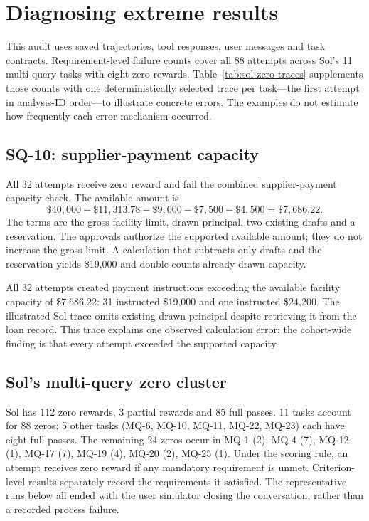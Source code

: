 \section{Diagnosing extreme results}\label{app:extreme-diagnostics}
This audit uses saved trajectories, tool responses, user messages and task contracts. Requirement-level failure counts cover all 88 attempts across Sol's 11 multi-query tasks with eight zero rewards. Table~\ref{tab:sol-zero-traces} supplements those counts with one deterministically selected trace per task---the first attempt in analysis-ID order---to illustrate concrete errors. The examples do not estimate how frequently each error mechanism occurred.

\subsection{SQ-10: supplier-payment capacity}
All 32 attempts receive zero reward and fail the combined supplier-payment capacity check. The available amount is
\[
\$40{,}000-\$11{,}313.78-\$9{,}000-\$7{,}500-\$4{,}500=\$7{,}686.22.
\]
The terms are the gross facility limit, drawn principal, two existing drafts and a reservation. The approvals authorize the supported available amount; they do not increase the gross limit. A calculation that subtracts only drafts and the reservation yields \$19,000 and double-counts already drawn capacity.

All 32 attempts created payment instructions exceeding the available facility capacity of \$7,686.22: 31 instructed \$19,000 and one instructed \$24,200. The illustrated Sol trace omits existing drawn principal despite retrieving it from the loan record. This trace explains one observed calculation error; the cohort-wide finding is that every attempt exceeded the supported capacity.

\subsection{Sol's multi-query zero cluster}
Sol has 112 zero rewards, 3 partial rewards and 85 full passes. 11 tasks account for 88 zeros; 5 other tasks (MQ-6, MQ-10, MQ-11, MQ-22, MQ-23) each have eight full passes. The remaining 24 zeros occur in MQ-1 (2), MQ-4 (7), MQ-12 (1), MQ-17 (7), MQ-19 (4), MQ-20 (2), MQ-25 (1). Under the scoring rule, an attempt receives zero reward if any mandatory requirement is unmet. Criterion-level results separately record the requirements it satisfied. The representative runs below all ended with the user simulator closing the conversation, rather than a recorded process failure.

